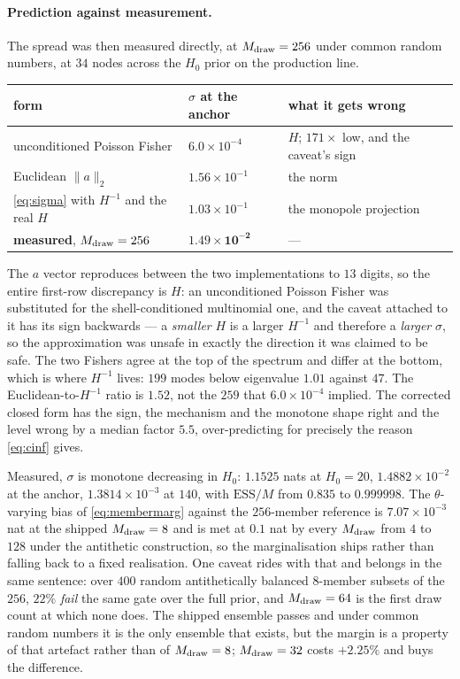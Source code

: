 \documentclass[11pt]{article}
\theoremstyle{definition}
\theoremstyle{remark}
\newcommand{\Mdraw}{M_{\rm draw}}
\newcommand{\ESS}{\mathrm{ESS}}
\begin{document}
\paragraph{Prediction against measurement.} The spread was then measured
directly, at $\Mdraw=256$ under common random numbers, at $34$ nodes across the
$H_0$ prior on the production line.

\begin{center}\small
\begin{tabular}{lll}
\toprule
form & $\sigma$ at the anchor & what it gets wrong \\
\midrule
unconditioned Poisson Fisher & $6.0\times10^{-4}$ & $H$; $171\times$ low, and the caveat's sign \\
Euclidean $\|a\|_2$ & $1.56\times10^{-1}$ & the norm \\
\eqref{eq:sigma} with $H^{-1}$ and the real $H$ & $1.03\times10^{-1}$ & the monopole projection \\
\textbf{measured}, $\Mdraw=256$ & $\mathbf{1.49\times10^{-2}}$ & --- \\
\bottomrule
\end{tabular}
\end{center}

\noindent The $a$ vector reproduces between the two implementations to $13$
digits, so the entire first-row discrepancy is $H$: an unconditioned Poisson
Fisher was substituted for the shell-conditioned multinomial one, and the caveat
attached to it has its sign backwards --- a \emph{smaller} $H$ is a larger
$H^{-1}$ and therefore a \emph{larger} $\sigma$, so the approximation was unsafe
in exactly the direction it was claimed to be safe. The two Fishers agree at the
top of the spectrum and differ at the bottom, which is where $H^{-1}$ lives:
$199$ modes below eigenvalue $1.01$ against $47$. The Euclidean-to-$H^{-1}$ ratio
is $1.52$, not the $259$ that $6.0\times10^{-4}$ implied. The corrected closed
form has the sign, the mechanism and the monotone shape right and the level wrong
by a median factor $5.5$, over-predicting for precisely the reason
\eqref{eq:cinf} gives.

Measured, $\sigma$ is monotone decreasing in $H_0$: $1.1525$ nats at $H_0=20$,
$1.4882\times10^{-2}$ at the anchor, $1.3814\times10^{-3}$ at $140$, with
$\ESS/M$ from $0.835$ to $0.999998$. The $\theta$-varying bias of
\eqref{eq:membermarg} against the $256$-member reference is $7.07\times10^{-3}$
nat at the shipped $\Mdraw=8$ and is met at $0.1$ nat by every $\Mdraw$ from $4$
to $128$ under the antithetic construction, so the marginalisation ships rather
than falling back to a fixed realisation. One caveat rides with that and belongs
in the same sentence: over $400$ random antithetically balanced $8$-member
subsets of the $256$, $22\%$ \emph{fail} the same gate over the full prior, and
$\Mdraw=64$ is the first draw count at which none does. The shipped ensemble
passes and under common random numbers it is the only ensemble that exists, but
the margin is a property of that artefact rather than of $\Mdraw=8$;
$\Mdraw=32$ costs $+2.25\%$ and buys the difference.
\end{document}
